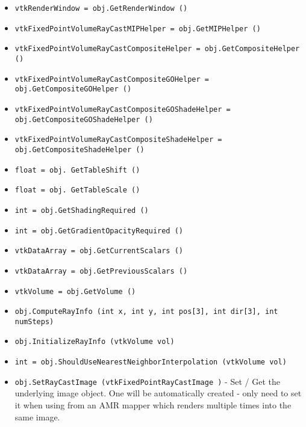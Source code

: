 \begin{itemize}
\item  \verb|vtkRenderWindow = obj.GetRenderWindow ()|

\item  \verb|vtkFixedPointVolumeRayCastMIPHelper = obj.GetMIPHelper ()|

\item  \verb|vtkFixedPointVolumeRayCastCompositeHelper = obj.GetCompositeHelper ()|

\item  \verb|vtkFixedPointVolumeRayCastCompositeGOHelper = obj.GetCompositeGOHelper ()|

\item  \verb|vtkFixedPointVolumeRayCastCompositeGOShadeHelper = obj.GetCompositeGOShadeHelper ()|

\item  \verb|vtkFixedPointVolumeRayCastCompositeShadeHelper = obj.GetCompositeShadeHelper ()|

\item  \verb|float = obj. GetTableShift ()|

\item  \verb|float = obj. GetTableScale ()|

\item  \verb|int = obj.GetShadingRequired ()|

\item  \verb|int = obj.GetGradientOpacityRequired ()|

\item  \verb|vtkDataArray = obj.GetCurrentScalars ()|

\item  \verb|vtkDataArray = obj.GetPreviousScalars ()|

\item  \verb|vtkVolume = obj.GetVolume ()|

\item  \verb|obj.ComputeRayInfo (int x, int y, int pos[3], int dir[3], int numSteps)|

\item  \verb|obj.InitializeRayInfo (vtkVolume vol)|

\item  \verb|int = obj.ShouldUseNearestNeighborInterpolation (vtkVolume vol)|

\item  \verb|obj.SetRayCastImage (vtkFixedPointRayCastImage )| -  Set / Get the underlying image object. One will be automatically
 created - only need to set it when using from an AMR mapper which
 renders multiple times into the same image.


\end{itemize}
